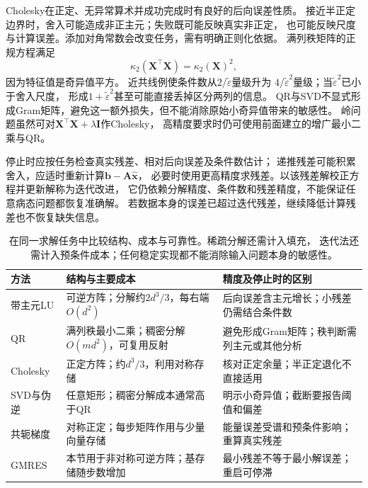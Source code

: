 Cholesky在正定、无异常算术并成功完成时有良好的后向误差性质。
接近半正定边界时，舍入可能造成非正主元；失败既可能反映真实非正定，
也可能反映尺度与计算误差。添加对角常数会改变任务，需有明确正则化依据。
满列秩矩阵的正规方程满足
\begin{equation}
 \kappa_2(\bm X^\top\bm X)=\kappa_2(\bm X)^2,
 \label{eq:matrix-analysis-normal-equation-condition-square}
\end{equation}
因为特征值是奇异值平方。
近共线例使条件数从$2/\widetilde\varepsilon$量级升为
$4/\widetilde\varepsilon^2$量级；当$\widetilde\varepsilon^2$已小于舍入尺度，
形成$1+\widetilde\varepsilon^2$甚至可能直接丢掉区分两列的信息。
QR与SVD不显式形成Gram矩阵，避免这一额外损失，但不能消除原始小奇异值带来的敏感性。
岭问题虽然可对$\bm X^\top\bm X+\lambda\bm I$作Cholesky，
高精度要求时仍可使用前面建立的增广最小二乘与QR。

停止时应按任务检查真实残差、相对后向误差及条件数估计；
递推残差可能积累舍入，应适时重新计算$\bm b-\bm A\widehat{\bm x}$，
必要时使用更高精度求残差。以该残差解校正方程并更新解称为迭代改进，
它仍依赖分解精度、条件数和残差精度，不能保证任意病态问题都恢复准确解。
若数据本身的误差已超过迭代残差，继续降低计算残差也不恢复缺失信息。

\begin{table}[htbp]
 \centering\small
 \begin{tabularx}{\linewidth}{@{}lXX@{}}
 \toprule
 方法 & 结构与主要成本 & 精度及停止时的区别\\
 \midrule
 带主元LU & 可逆方阵；分解约$2d^3/3$，每右端$O(d^2)$
 & 后向误差含主元增长；小残差仍需结合条件数\\
 QR & 满列秩最小二乘；稠密分解$O(md^2)$，可复用反射
 & 避免形成Gram矩阵；秩判断需列主元或其他分析\\
 Cholesky & 正定方阵；约$d^3/3$，利用对称存储
 & 核对正定余量；半正定退化不直接适用\\
 SVD与伪逆 & 任意矩形；稠密分解成本通常高于QR
 & 明示小奇异值；截断要报告阈值和偏差\\
 共轭梯度 & 对称正定；每步矩阵作用与少量向量存储
 & 能量误差受谱和预条件影响；重算真实残差\\
 GMRES & 本节用于非对称可逆方阵；基存储随步数增加
 & 最小残差不等于最小解误差；重启可停滞\\
 \bottomrule
 \end{tabularx}
 \caption{在同一求解任务中比较结构、成本与可靠性。稀疏分解还需计入填充，
 迭代法还需计入预条件成本；任何稳定实现都不能消除输入问题本身的敏感性。}
 \label{tab:matrix-analysis-solver-conditions}
\end{table}

